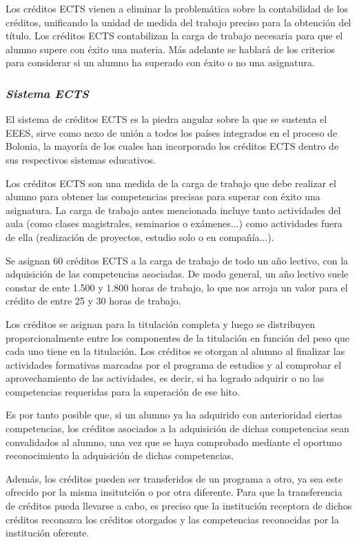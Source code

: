 		Los créditos ECTS vienen a eliminar la problemática sobre la contabilidad de los créditos, unificando la unidad de medida del trabajo preciso para la obtención del título. Los créditos ECTS contabilizan la carga de trabajo necesaria para que el alumno supere con éxito una materia. Más adelante se hablará de los criterios para considerar si un alumno ha superado con éxito o no una asignatura.
    
		\subsubsection{\bfseries \itshape Sistema ECTS} 
		El sistema de créditos ECTS\cite{ECTS-GUIDE:2009} es la piedra angular sobre la que se sustenta el EEES, sirve como nexo de unión a todos los países integrados en el proceso de Bolonia, la mayoría de los cuales han incorporado los créditos ECTS dentro de sus respectivos sistemas educativos.
    
		Los créditos ECTS son una medida de la carga de trabajo que debe realizar el alumno para obtener las competencias precisas para superar con éxito una asignatura. La carga de trabajo antes mencionada incluye tanto actividades del aula (como clases magistrales, seminarios o exámenes...) como actividades fuera de ella (realización de proyectos, estudio solo o en compañía...).
    
		Se asignan 60 créditos ECTS a la carga de trabajo de todo un año lectivo, con la adquisición de las competencias asociadas. De modo general, un año lectivo suele constar de ente 1.500 y 1.800 horas de trabajo, lo que nos arroja un valor para el crédito de entre 25 y 30 horas de trabajo.
    
		Los créditos se asignan para la titulación completa y luego se distribuyen proporcionalmente entre los componentes de la titulación en función del peso que cada uno tiene en la titulación. Los créditos se otorgan al alumno al finalizar las actividades formativas marcadas por el programa de estudios y al comprobar el aprovechamiento de las actividades, es decir, si ha logrado adquirir o no las competencias requeridas para la superación de ese hito.
    
		Es por tanto posible que, si un alumno ya ha adquirido con anterioridad ciertas competencias, los créditos asociados a la adquisición de dichas competencias sean convalidados al alumno, una vez que se haya comprobado mediante el oportuno reconocimiento la adquisición de dichas competencias.
    
		Además, los créditos pueden ser transferidos de un programa a otro, ya sea este ofrecido por la misma insitutción o por otra diferente. Para que la transferencia de créditos pueda llevarse a cabo, es preciso que la institución receptora de dichos créditos reconozca los créditos otorgados y las competencias reconocidas por la institución oferente. 
    
